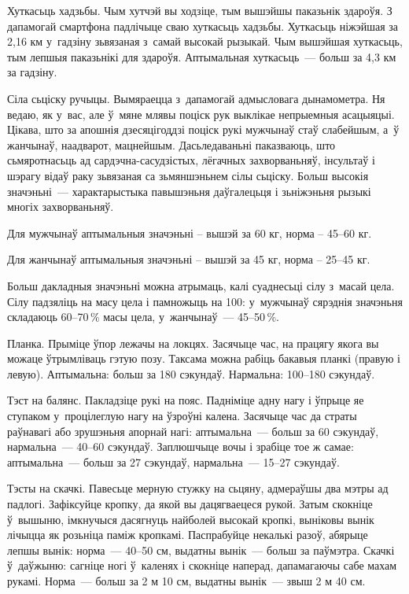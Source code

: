 Хуткасьць хадзьбы. Чым хутчэй вы ходзіце, тым вышэйшы паказьнік здароўя. З дапамогай смартфона падлічыце сваю хуткасьць хадзьбы. Хуткасьць ніжэйшая за 2,16 км у~гадзіну зьвязаная з~самай высокай рызыкай. Чым вышэйшая хуткасьць, тым лепшыя паказьнікі для здароўя. Аптымальная хуткасьць~--- больш за 4,3 км за гадзіну.

Сіла сьціску ручыцы. Вымяраецца з~дапамогай адмысловага дынамометра. Ня ведаю, як у~вас, але ў~мяне млявы поціск рук выклікае непрыемныя асацыяцыі. Цікава, што за апошнія дзесяцігоддзі поціск рукі мужчынаў стаў слабейшым, а~ў жанчынаў, наадварот, мацнейшым. Дасьледаваньні паказваюць, што сьмяротнасьць ад сардэчна-сасудзістых, лёгачных захворваньняў, інсультаў і шэрагу відаў раку зьвязаная са зьмяншэньнем сілы сьціску. Больш высокія значэньні~--- характарыстыка павышэньня даўгалецьця і зьніжэньня рызыкі многіх захворваньняў.

Для мужчынаў аптымальныя значэньні -- вышэй за 60 кг, норма -- 45--60 кг. 

Для жанчынаў аптымальныя значэньні -- вышэй за 45 кг, норма -- 25--45 кг. 

Больш дакладныя значэньні можна атрымаць, калі суаднесьці сілу з~масай цела. Сілу падзяліць на масу цела і памножыць на 100: у~мужчынаў сярэднія значэньня складаюць 60--70\,\% масы цела, у~жанчынаў~--- 45--50\,\%.

Планка. Прыміце ўпор лежачы на локцях. Засячыце час, на працягу якога вы можаце ўтрымліваць гэтую позу. Таксама можна рабіць бакавыя планкі (правую і левую). Аптымальна: больш за 180 сэкундаў. Нармальна: 100--180 сэкундаў.

Тэст на балянс. Пакладзіце рукі на пояс. Падніміце адну нагу і ўпрыце яе ступаком у~процілеглую нагу на ўзроўні калена. Засячыце час да страты раўнавагі або зрушэньня апорнай нагі: аптымальна~--- больш за 60 сэкундаў, нармальна~--- 40--60 сэкундаў. Заплюшчыце вочы і зрабіце тое ж самае: аптымальна~--- больш за 27 сэкундаў, нармальна~--- 15--27 сэкундаў.

Тэсты на скачкі. Павесьце мерную стужку на сьцяну, адмераўшы два мэтры ад падлогі. Зафіксуйце кропку, да якой вы дацягваецеся рукой. Затым скокніце ў~вышыню, імкнучыся дасягнуць найболей высокай кропкі, выніковы вынік лічыцца як розьніца паміж кропкамі. Паспрабуйце некалькі разоў, абярыце лепшы вынік: норма~--- 40--50 см, выдатны вынік~--- больш за паўмэтра. Скачкі ў~даўжыню: сагніце ногі ў~каленях і скокніце наперад, дапамагаючы сабе махам рукамі. Норма~--- больш за 2 м 10 см, выдатны вынік~--- звыш 2 м 40 см.

